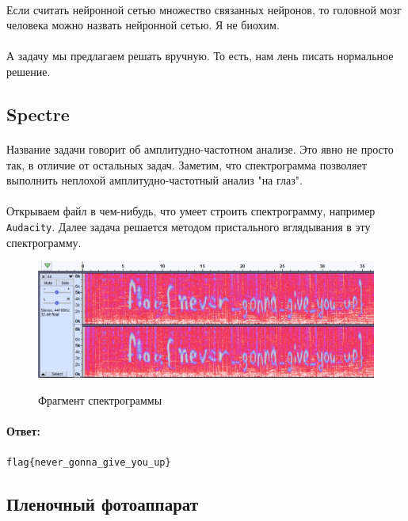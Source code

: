 \documentclass[12pt]{article}
\begin{document}
    \paragraph{}
    Если считать нейронной сетью множество связанных нейронов, то головной мозг человека можно назвать нейронной сетью.
    Я не биохим.
    \paragraph{}
    А задачу мы предлагаем решать вручную. То есть, нам лень писать нормальное решение.

    \subsection{Spectre}
    \paragraph{}
    Название задачи говорит об амплитудно-частотном анализе.
    Это явно не просто так, в отличие от остальных задач.
    Заметим, что спектрограмма позволяет выполнить неплохой амплитудно-частотный анализ "на глаз".
    \paragraph{}
    Открываем файл в чем-нибудь, что умеет строить спектрограмму, например \verb|Audacity|.
    Далее задача решается методом пристального вглядывания в эту спектрограмму.
    \begin{figure}[H]
        \centering
        \includegraphics[width=\linewidth]{task44}
        \label{fig:task44}
        \caption{Фрагмент спектрограммы}
    \end{figure}
    \paragraph{Ответ:}
    \verb|flag{never_gonna_give_you_up}|

    \subsection{Пленочный фотоаппарат}
\end{document}
